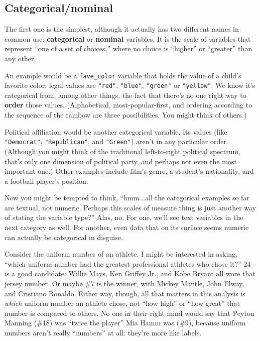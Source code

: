 \subsection{Categorical/nominal}

The first one is the simplest, although it actually has two different names in
common use: \textbf{categorical} or \textbf{nominal} variables. It is the scale
of variables that represent ``one of a set of choices,'' where no choice is
``higher'' or ``greater'' than any other.

An example would be a \texttt{fave\_color} variable that holds the value of a
child's favorite color: legal values are \texttt{"red"}, \texttt{"blue"},
\texttt{"green"} or \texttt{"yellow"}. We know it's categorical from, among
other things, the fact that there's no one right way to \textbf{order} those
values. (Alphabetical, most-popular-first, and ordering according to the
sequence of the rainbow are three possibilities. You might think of others.)

Political affiliation would be another categorical variable. Its values (like
\texttt{"Democrat"}, \texttt{"Republican"}, and \texttt{"Green"}) aren't in any
particular order. (Although you might think of the traditional left-to-right
political spectrum, that's only one dimension of political party, and perhaps
not even the most important one.) Other examples include film's genre, a
student's nationality, and a football player's position.

Now you might be tempted to think, ``hmm...all the categorical examples so far
are textual, not numeric. Perhaps this scales of measure thing is just another
way of stating the variable type?'' Alas, no. For one, we'll see text variables
in the next category as well. For another, even data that on its surface seems
numeric can actually be categorical in disguise.

Consider the uniform number of an athlete. I might be interested in asking,
``which uniform number had the greatest professional athletes who chose it?''
24 is a good candidate: Willie Mays, Ken Griffey Jr., and Kobe Bryant all wore
that jersey number. Or maybe \#7 is the winner, with Mickey Mantle, John Elway,
and Cristiano Ronaldo. Either way, though, all that matters in this analysis is
\textit{which} uniform number an athlete chose, not ``how high'' or ``how
great'' that number is compared to others. No one in their right mind would say
that Peyton Manning (\#18) was ``twice the player'' Mia Hamm was (\#9), because
uniform numbers aren't really ``numbers'' at all: they're more like labels.

